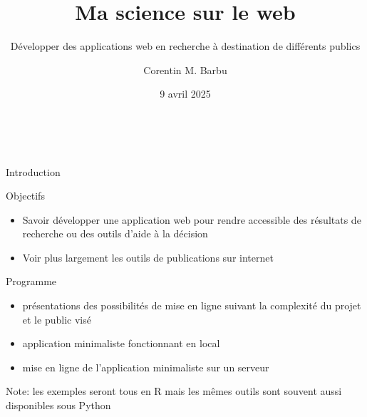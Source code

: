 \documentclass[pdftex,xcolor={table}]{beamer} %
\title[Ma science sur le web]{
Ma science sur le web
}
\subtitle{
Développer des applications web en recherche à destination de différents publics
}
\author[Corentin Barbu]{Corentin M. Barbu}
\date{9 avril 2025}
\institute[ABIES]{INRAE et Ecole Doctorale ABIES (réseau ADUM)}
\begin{document}
  \begin{frame}
    \titlepage
    \vfill
    ~
  \end{frame}

  \begin{frame}{Introduction}
    \begin{block}{Objectifs}
      \begin{itemize}
        \item Savoir développer une application web pour rendre accessible des résultats de recherche ou des outils d’aide à la décision
        \item Voir plus largement les outils de publications sur internet 
      \end{itemize}
      \begin{block}{Programme}
        \begin{itemize}
          \item présentations des possibilités de mise en ligne suivant la complexité du projet et le public visé
          \item application minimaliste fonctionnant en local
          \item mise en ligne de l'application minimaliste sur un serveur
        \end{itemize}
        Note: les exemples seront tous en R mais les mêmes outils sont souvent aussi disponibles sous Python
      \end{block}
    \end{block}

  \end{frame}
\end{document}
